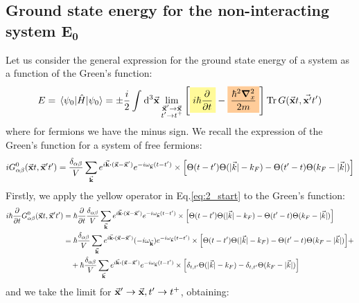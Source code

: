 \documentclass[11pt, a4paper, twoside, openright]{article}
\begin{document}
\subsection*{Ground state energy for the non-interacting system \( \pmb{E_0 } \)}
Let us consider the general expression for the ground state energy of a system as a function of the Green's function:
\begin{equation}
  E = \expval{\hat{H} }{\psi_0}
  = \pm \frac{i}{2}
  \int_{}^{} \dd[3]{\va{x}} \lim_{\substack{\va{x}'\rightarrow \va{x} \\ t' \rightarrow t^+} }  \qty[ \mathcolorbox{yellow!40}{i \hbar \pdv{}{t}} - \mathcolorbox{orange!40}{\frac{\hbar ^2 \grad ^2_x}{2m}}] \Tr G (\va{x}t,\va{x'}t')
  \label{eq:2_start}
\end{equation}
where for fermions we have the minus sign.
We recall the expression of the  Green's function for a system of free fermions:
\begin{equation}
  i G_{\alpha \beta }^0 (\va{x}t,\va{x}'t')
  = \frac{\delta _{\alpha \beta }}{V}
  \sum_{\va{k}}^{} e^{i \va{k}\vdot (\va{x}-\va{x}')}
  e^{-i \omega _{\va{k}} (t-t')}
   \times \qty[ \Theta (t-t') \Theta (\absvec{k} -k_F) - \Theta (t'-t) \Theta (k_F- \absvec{k} )]
   \label{eq:green_function_free2}
\end{equation}
Firstly, we apply the yellow operator in Eq.\eqref{eq:2_start} to the Green's function:
\begin{equation*}
\begin{split}
i \hbar \pdv{}{t} G_{\alpha \beta }^0 (\va{x}t,\va{x}'t') &=
 \hbar \pdv{}{t} \frac{\delta _{\alpha \beta }}{V}
\sum_{\va{k}}^{} e^{i \va{k}\vdot (\va{x}-\va{x}')}
e^{-i \omega _{\va{k}} (t-t')}
 \times \qty[ \Theta (t-t') \Theta (\absvec{k} -k_F) - \Theta (t'-t) \Theta (k_F- \absvec{k} )]
 \\
 &=  \hbar  \frac{\delta _{\alpha \beta }}{V}
 \sum_{\va{k}}^{} e^{i \va{k}\vdot (\va{x}-\va{x}')} (- i  \omega _{\va{k}})
 e^{-i \omega _{\va{k}} (t-t')}
  \times \qty[ \Theta (t-t') \Theta (\absvec{k} -k_F) - \Theta (t'-t) \Theta (k_F- \absvec{k} )] +\\
 & \quad +  \hbar
 \frac{\delta _{\alpha \beta }}{V}
 \sum_{\va{k}}^{} e^{i \va{k}\vdot (\va{x}-\va{x}')}
 e^{-i \omega _{\va{k}} (t-t')}
  \times \qty[ \delta _{t,t'} \Theta (\absvec{k} -k_F) - \delta _{t,t'} \Theta (k_F- \absvec{k} )]
\end{split}
\end{equation*}
and we take the limit for \( \va{x}' \rightarrow \va{x}, t' \rightarrow t^+ \), obtaining:
\end{document}
